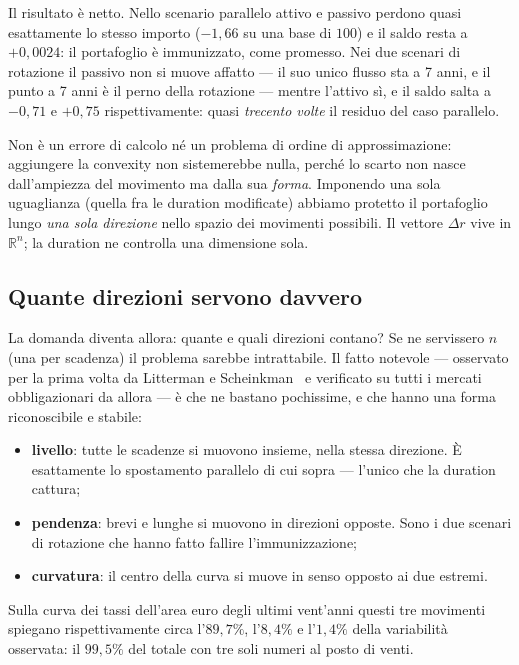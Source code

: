 \documentclass[11pt,a4paper]{article}
\theoremstyle{plain}
\theoremstyle{definition}
\theoremstyle{remark}
\newcommand{\R}{\mathbb{R}}
\begin{document}


Il risultato è netto. Nello scenario parallelo attivo e passivo perdono quasi esattamente lo
stesso importo ($-1{,}66$ su una base di $100$) e il saldo resta a $+0{,}0024$: il portafoglio
è immunizzato, come promesso. Nei due scenari di rotazione il passivo non si muove affatto ---
il suo unico flusso sta a 7 anni, e il punto a 7 anni è il perno della rotazione --- mentre
l'attivo sì, e il saldo salta a $-0{,}71$ e $+0{,}75$ rispettivamente: quasi \emph{trecento
volte} il residuo del caso parallelo.

\begin{keybox}
Non è un errore di calcolo né un problema di ordine di approssimazione: aggiungere la convexity
non sistemerebbe nulla, perché lo scarto non nasce dall'ampiezza del movimento ma dalla sua
\emph{forma}. Imponendo una sola uguaglianza (quella fra le duration modificate) abbiamo
protetto il portafoglio lungo \emph{una sola direzione} nello spazio dei movimenti possibili.
Il vettore $\Delta r$ vive in $\R^n$; la duration ne controlla una dimensione sola.
\end{keybox}

\subsection{Quante direzioni servono davvero}

La domanda diventa allora: quante e quali direzioni contano? Se ne servissero $n$ (una per
scadenza) il problema sarebbe intrattabile. Il fatto notevole --- osservato per la prima volta
da Litterman e Scheinkman~\cite{litterman1991} e verificato su tutti i mercati obbligazionari
da allora --- è che ne bastano pochissime, e che hanno una forma riconoscibile e stabile:
\begin{itemize}
  \item \textbf{livello}: tutte le scadenze si muovono insieme, nella stessa direzione. È
        esattamente lo spostamento parallelo di cui sopra --- l'unico che la duration cattura;
  \item \textbf{pendenza}: brevi e lunghe si muovono in direzioni opposte. Sono i due scenari
        di rotazione che hanno fatto fallire l'immunizzazione;
  \item \textbf{curvatura}: il centro della curva si muove in senso opposto ai due estremi.
\end{itemize}
Sulla curva dei tassi dell'area euro degli ultimi vent'anni questi tre movimenti spiegano
rispettivamente circa l'$89{,}7\%$, l'$8{,}4\%$ e l'$1{,}4\%$ della variabilità osservata: il
$99{,}5\%$ del totale con tre soli numeri al posto di venti.
\end{document}
